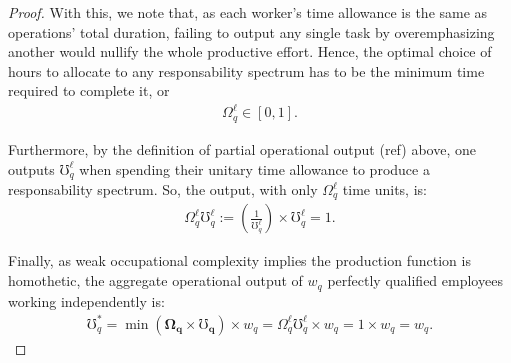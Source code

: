 \documentclass[hidelinks, nonatbib]{elsarticle}
\begin{document}
\begin{lemma}
\begin{proof}
        With this, we note that, as each worker's time allowance is the same as operations' total duration, failing to output any single task by overemphasizing another would nullify the whole productive effort. Hence, the optimal choice of hours to allocate to any responsability spectrum has to be the minimum time required to complete it, or
        \begin{gather}
            \Omega_{q}^{\ell} 
            \in
            [0,1]
            .
        \end{gather}
        
        Furthermore, by the definition of partial operational output (ref) above, one outputs $\mho_{q}^{\ell}$ when spending their unitary time allowance to produce a responsability spectrum. So, the output, with only $\Omega_{q}^{\ell}$ time units, is:
        \begin{gather}
            \Omega_{q}^{\ell}
            \mho_{q}^{\ell}
            :=
            \left(
                \frac{1}{\mho_{q}^{\ell}}
            \right)
            \times
            \mho_{q}^{\ell}
            =
            1
            .
        \end{gather}
        
        Finally, as weak occupational complexity implies the production function is homothetic, the aggregate operational output of $w_q$ perfectly qualified employees working independently is:
        \begin{gather}
            \mho_{q}^{*}
            =
            \min(
                \boldsymbol{\Omega_q}
                \times
                \boldsymbol{\mho_q}
            )
            \times
            w_q
            =
            \Omega_{q}^{\ell}
            \mho_{q}^{\ell}
            \times
            w_q
            =
            1
            \times
            w_q
            =
            w_q
            .
        \end{gather}
        

\end{proof}
\end{lemma}
\end{document}
